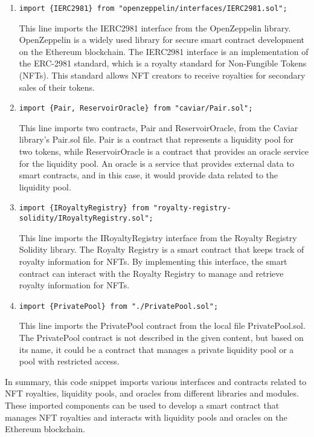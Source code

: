 \begin{enumerate}
\def\labelenumi{\arabic{enumi}.}
\item
  \texttt{import\ \{IERC2981\}\ from\ "openzeppelin/interfaces/IERC2981.sol";}

  This line imports the IERC2981 interface from the OpenZeppelin
  library. OpenZeppelin is a widely used library for secure smart
  contract development on the Ethereum blockchain. The IERC2981
  interface is an implementation of the ERC-2981 standard, which is a
  royalty standard for Non-Fungible Tokens (NFTs). This standard allows
  NFT creators to receive royalties for secondary sales of their tokens.
\item
  \texttt{import\ \{Pair,\ ReservoirOracle\}\ from\ "caviar/Pair.sol";}

  This line imports two contracts, Pair and ReservoirOracle, from the
  Caviar library's Pair.sol file. Pair is a contract that represents a
  liquidity pool for two tokens, while ReservoirOracle is a contract
  that provides an oracle service for the liquidity pool. An oracle is a
  service that provides external data to smart contracts, and in this
  case, it would provide data related to the liquidity pool.
\item
  \texttt{import\ \{IRoyaltyRegistry\}\ from\ "royalty-registry-solidity/IRoyaltyRegistry.sol";}

  This line imports the IRoyaltyRegistry interface from the Royalty
  Registry Solidity library. The Royalty Registry is a smart contract
  that keeps track of royalty information for NFTs. By implementing this
  interface, the smart contract can interact with the Royalty Registry
  to manage and retrieve royalty information for NFTs.
\item
  \texttt{import\ \{PrivatePool\}\ from\ "./PrivatePool.sol";}

  This line imports the PrivatePool contract from the local file
  PrivatePool.sol. The PrivatePool contract is not described in the
  given content, but based on its name, it could be a contract that
  manages a private liquidity pool or a pool with restricted access.
\end{enumerate}

In summary, this code snippet imports various interfaces and contracts
related to NFT royalties, liquidity pools, and oracles from different
libraries and modules. These imported components can be used to develop
a smart contract that manages NFT royalties and interacts with liquidity
pools and oracles on the Ethereum blockchain.

